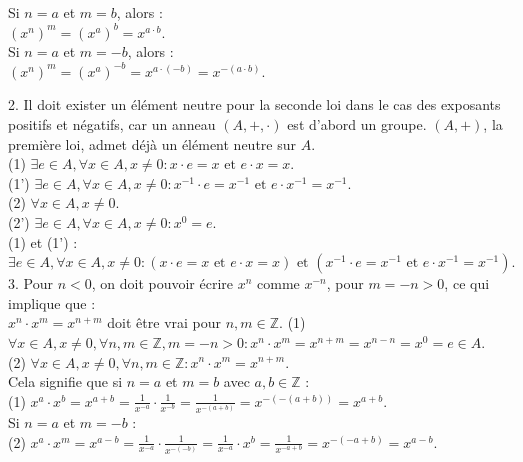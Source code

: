 \documentclass{article}
\begin{document}
Si \(n = a\) et \(m = b\), alors :\\
\((x^n)^m = (x^a)^b = x^{a \cdot b}.\)\\

Si \(n = a\) et \(m = -b\), alors :\\
\((x^n)^m = (x^a)^{-b} = x^{a \cdot (-b)} = x^{-(a \cdot b)}.\)

2. Il doit exister un élément neutre pour la seconde loi dans le cas des exposants positifs et négatifs, car un anneau \((A, +, \cdot)\) est d'abord un groupe. \((A, +)\), la première loi, admet déjà un élément neutre sur \(A\).\\

(1) \(\exists e \in A, \forall x \in A, x \neq 0 : x \cdot e = x \text{ et } e \cdot x = x.\)\\
(1') \(\exists e \in A, \forall x \in A, x \neq 0 : x^{-1} \cdot e = x^{-1} \text{ et } e \cdot x^{-1} = x^{-1}.\)\\

(2) \(\forall x \in A, x \neq 0.\)\\
(2') \(\exists e \in A, \forall x \in A, x \neq 0 : x^0 = e.\)\\

(1) et (1') :\\
\(\exists e \in A, \forall x \in A, x \neq 0 : (x \cdot e = x \text{ et } e \cdot x = x) \text{ et } (x^{-1} \cdot e = x^{-1} \text{ et } e \cdot x^{-1} = x^{-1}).\)\\

3. Pour \(n < 0\), on doit pouvoir écrire \(x^n\) comme \(x^{-n}\), pour \(m = -n > 0\), ce qui implique que :\\
\(x^n \cdot x^m = x^{n + m}\) doit être vrai pour \(n, m \in \mathbb{Z}.\)
(1) \(\forall x \in A, x \neq 0, \forall n, m \in \mathbb{Z}, m = -n > 0 : x^n \cdot x^m = x^{n+m} = x^{n-n} = x^0 = e \in A.\)\\
(2) \(\forall x \in A, x \neq 0, \forall n, m \in \mathbb{Z} : x^n \cdot x^m = x^{n+m}.\)\\

Cela signifie que si \(n = a\) et \(m = b\) avec \(a, b \in \mathbb{Z}\) :\\

(1) \(x^a \cdot x^b = x^{a+b} = \frac{1}{x^{-a}} \cdot \frac{1}{x^{-b}} = \frac{1}{x^{-(a+b)}} = x^{-(-(a+b))} = x^{a+b}.\)\\
Si \(n = a\) et \(m = -b\) :\\
(2) \(x^a \cdot x^m = x^{a-b} = \frac{1}{x^{-a}} \cdot \frac{1}{x^{-(-b)}} = \frac{1}{x^{-a}} \cdot x^b = \frac{1}{x^{-a+b}} = x^{-(-a+b)} = x^{a-b}.\)

\maketitle
\end{document}
